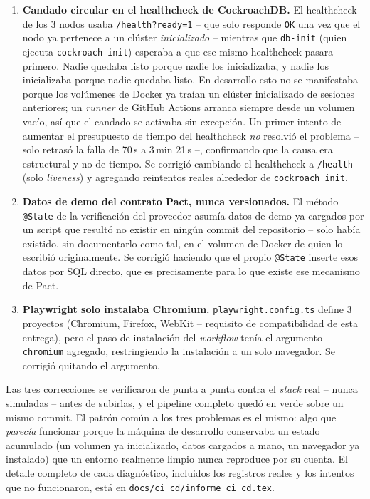 \begin{enumerate}[nosep]
  \item \textbf{Candado circular en el healthcheck de CockroachDB.} El healthcheck de los 3
        nodos usaba \texttt{/health?ready=1} -- que solo responde \texttt{OK} una vez que el
        nodo ya pertenece a un clúster \emph{inicializado} -- mientras que \texttt{db-init} (quien
        ejecuta \texttt{cockroach init}) esperaba a que ese mismo healthcheck pasara primero.
        Nadie quedaba listo porque nadie los inicializaba, y nadie los inicializaba porque nadie
        quedaba listo. En desarrollo esto no se manifestaba porque los volúmenes de Docker ya
        traían un clúster inicializado de sesiones anteriores; un \emph{runner} de GitHub
        Actions arranca siempre desde un volumen vacío, así que el candado se activaba sin
        excepción. Un primer intento de aumentar el presupuesto de tiempo del healthcheck
        \emph{no} resolvió el problema -- solo retrasó la falla de 70\,s a 3\,min 21\,s --,
        confirmando que la causa era estructural y no de tiempo. Se corrigió cambiando el
        healthcheck a \texttt{/health} (solo \emph{liveness}) y agregando reintentos reales
        alrededor de \texttt{cockroach init}.
  \item \textbf{Datos de demo del contrato Pact, nunca versionados.} El método \texttt{@State}
        de la verificación del proveedor asumía datos de demo ya cargados por un script que
        resultó no existir en ningún commit del repositorio -- solo había existido, sin
        documentarlo como tal, en el volumen de Docker de quien lo escribió originalmente. Se
        corrigió haciendo que el propio \texttt{@State} inserte esos datos por SQL directo, que
        es precisamente para lo que existe ese mecanismo de Pact.
  \item \textbf{Playwright solo instalaba Chromium.} \texttt{playwright.config.ts} define 3
        proyectos (Chromium, Firefox, WebKit -- requisito de compatibilidad de esta entrega),
        pero el paso de instalación del \emph{workflow} tenía el argumento
        \texttt{chromium} agregado, restringiendo la instalación a un solo navegador. Se
        corrigió quitando el argumento.
\end{enumerate}

Las tres correcciones se verificaron de punta a punta contra el \emph{stack} real -- nunca
simuladas -- antes de subirlas, y el pipeline completo quedó en verde sobre un mismo commit. El
patrón común a los tres problemas es el mismo: algo que \emph{parecía} funcionar porque la
máquina de desarrollo conservaba un estado acumulado (un volumen ya inicializado, datos cargados
a mano, un navegador ya instalado) que un entorno realmente limpio nunca reproduce por su cuenta.
El detalle completo de cada diagnóstico, incluidos los registros reales y los intentos que no
funcionaron, está en \texttt{docs/ci\_cd/informe\_ci\_cd.tex}.

